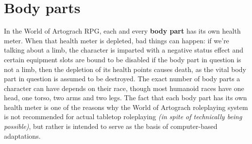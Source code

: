 \documentclass[openany,11pt,a4paper]{book}
\begin{document}
\section{Body parts}
In the World of Artograch RPG, each and every \textbf{body part} has its own health meter. When that health meter is depleted, bad things can happen: if we're talking about a limb, the character is imparted with a negative status effect and certain equipment slots are bound to be disabled \textemdash if the body part in question is not a limb, then the depletion of its health points causes death, as the vital body part in question is assumed to be destroyed.\newline
The exact number of body parts a character can have depends on their race, though most humanoid races have one head, one torso, two arms and two legs.\newline
The fact that each body part has its own health meter is one of the reasons why the World of Artograch roleplaying system is not recommended for actual tabletop roleplaying \textit{(in spite of technically being possible)}, but rather is intended to serve as the basis of computer-based adaptations.
\end{document}
